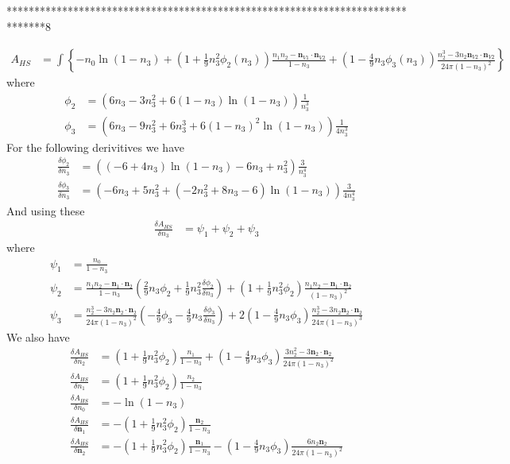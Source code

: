 {*******************************************************************************8
 
\begin{align} 
A_{HS} &= \int \left\{
    -n_0 \ln\left(1 - n_3\right)
    + \left(1 + \frac{1}{9}n_3^2 \phi_2(n_3)\right)   \frac{n_1 n_2 - \mathbf{n}_{V1} \cdot\mathbf{n}_{V2}}{1-n_3}
    + \left(1 - \frac{4}{9}n_3\phi_3(n_3)\right)\frac{n_2^3 - 3 n_2 \mathbf{n}_{V2} \cdot \mathbf{n}_{V2}}{24\pi (1-n_3)^2}
    \right\}
\end{align}
 where
 \begin{align}
   \phi_2 &= \left(6n_3 - 3n_3^2 + 6(1-n_3)\ln(1-n_3)\right)\frac{1}{n_3^3}\\
   \phi_3 &= \left(6n_3 - 9n_3^2 + 6n_3^3 + 6(1-n_3)^2 \ln(1-n_3)\right)\frac{1}{4n_3^3}
 \end{align}
For the following derivitives we have
\begin{align}
   \frac{\delta \phi_2}{\delta n_3} &= \left((-6+4n_3)\ln(1-n_3) - 6n_3 + n_3^2\right)\frac{3}{n_3^4}\\
   \frac{\delta \phi_3}{\delta n_3} &= \left(-6n_3 + 5n_3^2 + (-2n_3^2 + 8n_3 -6)\ln(1-n_3)\right)\frac{3}{4n_3^4}
 \end{align}
And using these
\begin{align}
  \frac{\delta A_{HS}}{\delta n_3} &= \psi _1 + \psi _2 + \psi _3
\end{align}
where
\begin{align}
  \psi_1 &= \frac{n_0}{1-n_3}\\
  \psi_2 &= \frac{n_1n_2 - \mathbf{n}_1\cdot \mathbf{n}_2}{1-n_3}\left(\frac{2}{9}n_3\phi_2 + \frac{1}{9}n_3^2\frac{\delta \phi_2}{\delta n_3}\right) + \left(1 + \frac{1}{9}n_3^2\phi_2\right)\frac{n_1n_2 - \mathbf{n}_1\cdot \mathbf{n}_2}{(1-n_3)^2}\\
  \psi_3 &= \frac{n_2^3 - 3n_2\mathbf{n}_2 \cdot \mathbf{n}_2}{24\pi(1-n_3)^2}\left(-\frac{4}{9}\phi_3 - \frac{4}{9}n_3\frac{\delta \phi_3}{\delta n_3}\right) + 2\left(1 - \frac{4}{9}n_3\phi_3\right)\frac{n_2^3 - 3n_2\mathbf{n}_2 \cdot \mathbf{n}_2}{24\pi(1-n_3)^3} 
\end{align}
We also have
\begin{align}
  \frac{\delta A_{HS}}{\delta n_2} &= (1 + \frac{1}{9}n_3^2\phi_2)\frac{n_1}{1-n_3} + (1 - \frac{4}{9}n_3\phi_3)\frac{3n_2^2 - 3\mathbf{n}_2 \cdot \mathbf{n}_2}{24\pi(1 - n_3)^2}\\
  \frac{\delta A_{HS}}{\delta n_1} &= (1 + \frac{1}{9}n_3^2\phi_2)\frac{n_2}{1 - n_3}\\
  \frac{\delta A_{HS}}{\delta n_0} &= -\ln(1 - n_3)\\
  \frac{\delta A_{HS}}{\delta \mathbf{n}_1} &= -(1 + \frac{1}{9}n_3^2 \phi_2)\frac{\mathbf{n}_2}{1 - n_3}\\
  \frac{\delta A_{HS}}{\delta \mathbf{n}_2} &= -(1 + \frac{1}{9}n_3^2\phi_2)\frac{\mathbf{n}_1}{1 - n_3} 
  - (1 - \frac{4}{9}n_3\phi_3)\frac{6n_2\mathbf{n}_2}{24\pi(1 - n_3)^2}
\end{align}




}

